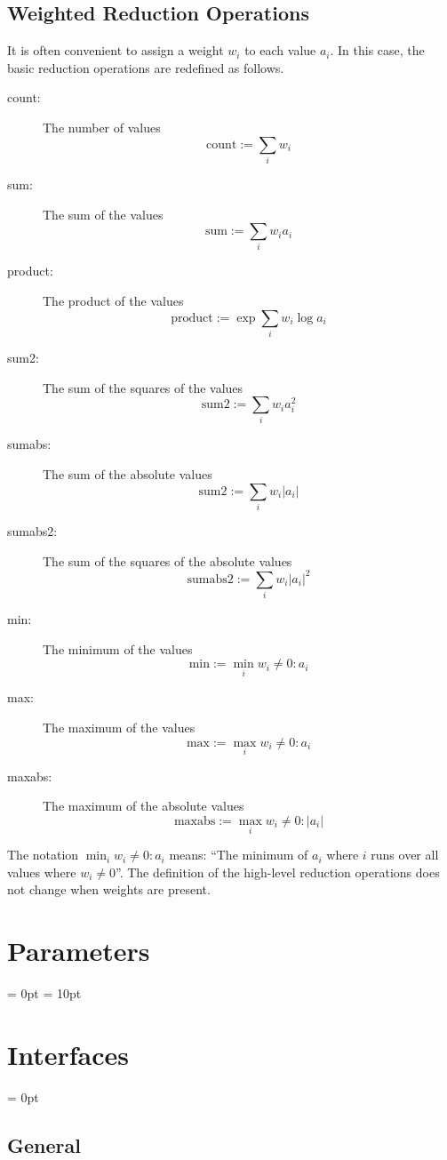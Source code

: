 \subsection{Weighted Reduction Operations}
It is often convenient to assign a weight $w_i$ to each value $a_i$.
In this case, the basic reduction operations are redefined as follows.
\begin{description}
\item[count:] The number of values
$$ \mathrm{count} := \sum_i w_i $$
\item[sum:] The sum of the values
$$ \mathrm{sum} := \sum_i w_i a_i $$
\item[product:] The product of the values
$$ \mathrm{product} := \exp \sum_i w_i \log a_i $$
\item[sum2:] The sum of the squares of the values
$$ \mathrm{sum2} := \sum_i w_i a_i^2 $$
\item[sumabs:] The sum of the absolute values
$$ \mathrm{sum2} := \sum_i w_i |a_i| $$
\item[sumabs2:] The sum of the squares of the absolute values
$$ \mathrm{sumabs2} := \sum_i w_i |a_i|^2 $$
\item[min:] The minimum of the values
$$ \mathrm{min} := \min_i w_i \ne 0: a_i $$
\item[max:] The maximum of the values
$$ \mathrm{max} := \max_i w_i \ne 0: a_i $$
\item[maxabs:] The maximum of the absolute values
$$ \mathrm{maxabs} := \max_i w_i \ne 0: |a_i| $$
\end{description}
The notation $\min_i w_i \ne 0: a_i$ means: ``The minimum of $a_i$
where $i$ runs over all values where $w_i \ne 0$''.  The definition of
the high-level reduction operations does not change when weights are
present.




\section{Parameters} 


\parskip = 0pt
\parskip = 10pt 

\section{Interfaces} 


\parskip = 0pt

\vspace{3mm} \subsection*{General}

